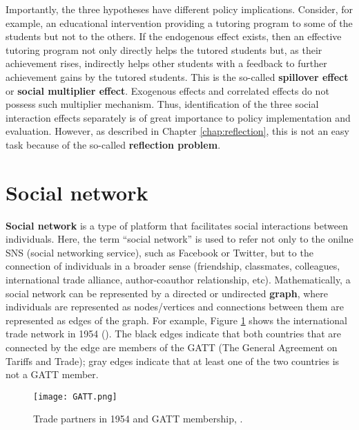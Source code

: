 \documentclass[11pt, A4paper, openany, uplatex]{book}
\begin{document}
Importantly, the three hypotheses have different policy implications.
Consider, for example, an educational intervention providing a tutoring program to some of the students but not to the others.
If the endogenous effect exists, then an effective tutoring program not only directly helps the tutored students but, as their achievement rises, indirectly helps  other students with a feedback to further achievement gains by the tutored students.
This is the so-called \textbf{spillover effect} or \textbf{social multiplier effect}.
Exogenous effects and correlated effects do not possess such multiplier mechanism.
Thus, identification of the three social interaction effects separately is of great importance to policy implementation and evaluation.
However, as described in Chapter \ref{chap:reflection}, this is not an easy task because of the so-called \textbf{reflection problem}.

\section{Social network}

\textbf{Social network} is a type of platform that facilitates social interactions between individuals.
Here, the term ``social network'' is used to refer not only to the onilne SNS (social networking service), such as Facebook or Twitter, but to the connection of individuals in a broader sense (friendship, classmates, colleagues, international trade alliance, author-coauthor relationship, etc).
Mathematically, a social network can be represented by a directed or undirected \textbf{graph}, where individuals are represented as nodes/vertices and connections between them are represented as edges of the graph.
For example, Figure \ref{fig:GATT} shows the international trade network in 1954 (\cite{arpino2017implementing}).
The black edges indicate that both countries that are connected by the edge are members of the GATT (The General Agreement on Tariffs and Trade); gray edges indicate that at least one of the two countries is not a GATT member. 

\begin{figure}[h!]
	\begin{center}
		\texttt{[image: GATT.png]}
		\caption{Trade partners in 1954 and GATT membership, \cite{arpino2017implementing}.}
		\label{fig:GATT}
	\end{center}
\end{figure}
\end{document}

